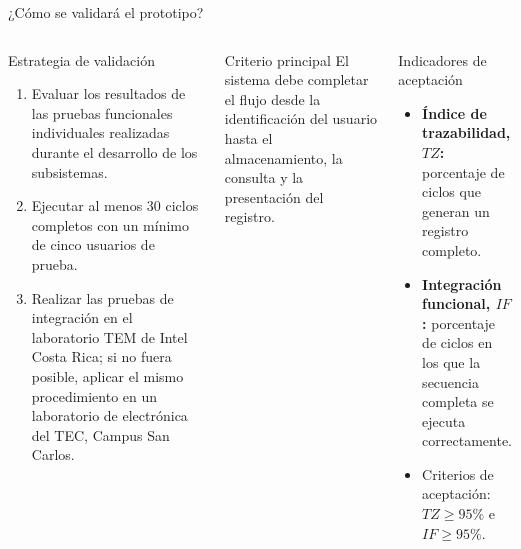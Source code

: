 \documentclass[aspectratio=169]{beamer}
\begin{document}
\begin{frame}{¿Cómo se validará el prototipo?}

\scriptsize

\begin{columns}[T]


    \begin{block}{Estrategia de validación}
        \begin{enumerate}
            \item Evaluar los resultados de las pruebas funcionales individuales
            realizadas durante el desarrollo de los subsistemas.

            \item Ejecutar al menos 30 ciclos completos con un mínimo de cinco
            usuarios de prueba.

            \item Realizar las pruebas de integración en el laboratorio TEM de Intel
            Costa Rica; si no fuera posible, aplicar el mismo procedimiento en un
            laboratorio de electrónica del TEC, Campus San Carlos.
        \end{enumerate}
    \end{block}

    \vspace{0.15cm}

    \begin{alertblock}{Criterio principal}
        El sistema debe completar el flujo desde la identificación del usuario hasta
        el almacenamiento, la consulta y la presentación del registro.
    \end{alertblock}


    \begin{block}{Indicadores de aceptación}
        \begin{itemize}
            \item \textbf{Índice de trazabilidad, $TZ$:} porcentaje de ciclos que
            generan un registro completo.

            \item \textbf{Integración funcional, $IF$:} porcentaje de ciclos en los
            que la secuencia completa se ejecuta correctamente.

            \item Criterios de aceptación: $TZ \geq 95\%$ e $IF \geq 95\%$.
        \end{itemize}
    \end{block}

\end{columns}

\end{frame}
\end{document}
